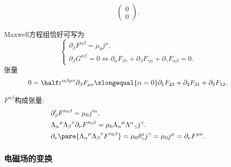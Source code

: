 \documentclass[hidelinks]{ctexart}
\begin{document}
\begin{cenum}
\begin{align*}
\begin{pmatrix}
            0 \\ 0
        \end{pmatrix}.
    \end{align*}
    \item Maxwell方程组恰好可写为
    \[ \begin{cases}
        \partial_\beta F^{\alpha\beta} = \mu_0 j^\alpha, \\
        \partial_\beta G^{\alpha\beta} = 0 \Leftrightarrow \partial_\alpha F_{\beta\gamma} + \partial_\beta F_{\gamma\alpha} + \partial_\gamma F_{\alpha\beta} = 0.
    \end{cases} \]
    张量
    \[ 0 = \half \varepsilon^{\alpha\beta\mu\nu}\partial_\beta F_{\mu\nu} \xlongequal{\alpha = 0} \partial_1 F_{23} + \partial_2 F_{31} + \partial_3 F_{12}. \]
    \item $F^{\alpha\beta}$构成张量:
    \begin{align*}
        & \partial'_\beta F'^{\alpha\beta} = \mu_0 j'^\alpha, \\
        & {\Lambda_\alpha}^\mu {\Lambda_\beta}^\nu \partial_\nu F'^{\alpha\beta} = \mu_0 {\Lambda_\alpha}^\mu {\Lambda^\alpha}_\gamma j^\gamma. \\
        & \partial_\nu \pare{{\Lambda_\alpha}^\mu{\Lambda_\beta}^\nu F'^{\alpha\beta}} = \mu_0 \delta^\mu_\gamma j^\gamma = \mu_0 j^\mu = \partial_\nu F^{\mu\nu}.
    \end{align*}
\end{cenum}


\subsubsection{电磁场的变换} %
\label{ssub:电磁场的变换}
\end{document}
